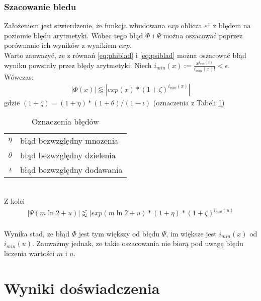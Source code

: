 \documentclass[11pt,wide]{mwart}
\begin{document}
\subsubsection{Szacowanie bledu}
\label{sec:bl}
Założeniem jest stwierdzenie, że funkcja wbudowana $exp$ oblicza $e^x$ z błędem na poziomie błędu arytmetyki. Wobec tego błąd $\Phi$ i $\Psi$ można oszacować poprzez porównanie ich wyników z wynikiem $exp$.\\
\indent Warto zauważyć, ze z równań \ref{eq:phiblad} i \ref{eq:psiblad} można oszacować błąd wyniku powstały przez błędy arytmetyki. Niech $i_{min}(x) := \frac{x^{i_{min}(x)}}{{i_{min}(x)}!} < \epsilon$. \\ \indent Wówczas: \\
\begin{gather}
    |\Phi(x)| \lessapprox |exp(x) * (1 + \zeta)^{i_{min}(x)}|
\end{gather}
gdzie $(1 + \zeta) = (1 + \eta)*(1 + \theta)/(1 - \iota)$ (oznaczenia z Tabeli \ref{tab:bl})\\
\begin{table}[h]
    \centering
\begin{tabular}{r l}
    \hline
    $\eta$ & błąd bezwzględny mnozenia\\
      $\theta$ & błąd bezwzględny dzielenia\\
       $\iota$ & błąd bezwzględny dodawania\\
    \hline
\end{tabular}
\caption{Oznaczenia błędów}
\label{tab:bl}
\end{table}
\\ Z kolei
\begin{gather}
    |\Psi(m\ln 2 + u)| \lessapprox |exp(m\ln 2 + u) * (1 + \eta) * (1 + \zeta)^{i_{min}(u)}
\end{gather}
\\ \indent Wynika stad, ze błąd $\Phi$ jest tym większy od błędu $\Psi$, im większe jest $i_{min}(x)$ od $i_{min}(u)$. Zauważmy jednak, ze takie oszacowania nie biorą pod uwagę błędu liczenia wartości $m$ i $u$.

\section{Wyniki doświadczenia}
\end{document}
